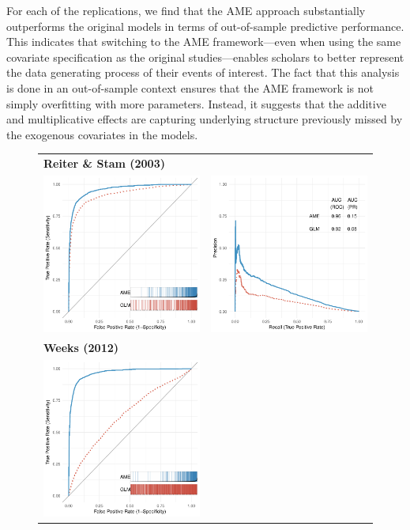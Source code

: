 For each of the replications, we find that the AME approach substantially outperforms the original models in terms of out-of-sample predictive performance. This indicates that switching to the AME framework---even when using the same covariate specification as the original studies---enables scholars to better represent the data generating process of their events of interest. The fact that this analysis is done in an out-of-sample context ensures that the AME framework is not simply overfitting with more parameters. Instead, it suggests that the additive and multiplicative effects are capturing underlying structure previously missed by the exogenous covariates in the models.

\begin{figure}
	\centering
	\begin{tabular}{cc}
		\multicolumn{2}{l}{\textbf{\tiny{Reiter \& Stam (2003)}}} \\
		\includegraphics[width=.4\textwidth]{graphics/reiter_stam_roc_outSample.pdf} &
		\includegraphics[width=.4\textwidth]{graphics/reiter_stam_pr_outSample.pdf} \\
		\multicolumn{2}{l}{\textbf{\tiny{Weeks (2012)}}} \\
		\includegraphics[width=.4\textwidth]{graphics/weeks_roc_outSample.pdf} &

\end{tabular}
\end{figure}
